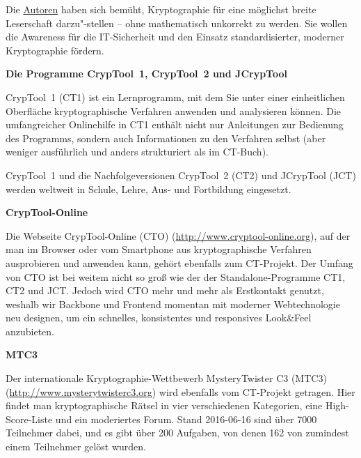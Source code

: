 Die \hyperlink{appendix-authors}{Autoren}
haben sich bemüht, Kryptographie für eine möglichst breite Leserschaft
darzu"-stellen -- ohne mathematisch unkorrekt zu werden. Sie wollen die
Awareness für die IT-Sicherheit und den Einsatz standardisierter, moderner
Kryptographie fördern.

\bigskip

\textbf{Die Programme CrypTool~1,
  CrypTool~2 und JCrypTool}

CrypTool~1 (CT1) ist ein Lernprogramm, mit dem Sie unter einer einheitlichen Oberfläche
kryptographische Verfahren anwenden und analysieren können. Die umfangreicher Onlinehilfe
in CT1 enthält nicht nur Anleitungen zur Bedienung des Programms, sondern auch
Informationen zu den Verfahren selbst (aber weniger ausführlich und anders
strukturiert als im CT-Buch).

CrypTool~1 und die Nachfolgeversionen CrypTool~2 (CT2) und JCrypTool (JCT)
werden weltweit in Schule, Lehre, Aus- und Fortbildung eingesetzt.

\bigskip

\textbf{CrypTool-Online}

Die Webseite CrypTool-Online (CTO) (\url{http://www.cryptool-online.org}), auf
der man im Browser oder vom Smartphone aus kryptographische Verfahren
ausprobieren und anwenden kann, gehört ebenfalls zum CT-Projekt. Der Umfang
von CTO ist bei weitem nicht so groß wie der der Standalone-Programme CT1,
CT2 und JCT. Jedoch wird CTO mehr und mehr als Erstkontakt genutzt, weshalb
wir Backbone und Frontend momentan mit moderner Webtechnologie neu designen,
um ein schnelles, konsistentes und responsives Look\&Feel anzubieten.

\bigskip

\textbf{MTC3}

Der internationale Kryptographie-Wettbewerb
MysteryTwister C3 (MTC3) (\url{http://www.mysterytwisterc3.org})
wird ebenfalls vom CT-Projekt getragen.
Hier findet man kryptographische Rätsel in vier verschiedenen Kategorien, eine
High-Score-Liste und ein moderiertes Forum. Stand 2016-06-16 sind über 7000
Teilnehmer dabei, und es gibt über 200 Aufgaben, von denen 162 von
zumindest einem Teilnehmer gelöst wurden.

